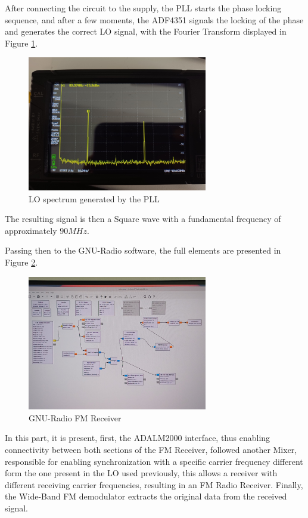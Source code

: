 After connecting the circuit to the supply, the PLL starts the phase locking sequence, and after a few moments, the ADF4351 signals the locking of the phase and generates the correct LO signal, with the Fourier Transform displayed in Figure \ref{fig:RFFE_LO}.

\begin{figure}[H]
    \centering
    \includegraphics*[width=0.7\textwidth]{Images/RRFE_LO.jpeg}
    \caption{LO spectrum generated by the PLL}
    \label{fig:RFFE_LO}
\end{figure}

The resulting signal is then a Square wave with a fundamental frequency of approximately $90MHz$.

Passing then to the GNU-Radio software, the full elements are presented in Figure \ref{fig:RFFE_GNU}.

\begin{figure}[H]
    \centering
    \includegraphics*[width=0.7\textwidth]{Images/RFFE_GNU.jpeg}
    \caption{GNU-Radio FM Receiver}
    \label{fig:RFFE_GNU}
\end{figure}

In this part, it is present, first, the ADALM2000 interface, thus enabling connectivity between both sections of the FM Receiver, followed another Mixer, responsible for enabling synchronization with a specific carrier frequency different form the one present in the LO used previously, this allows a receiver with different receiving carrier frequencies, resulting in an FM Radio Receiver. Finally, the Wide-Band FM demodulator extracts the original data from the received signal.

